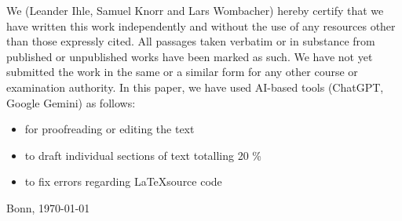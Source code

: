 
\thispagestyle{empty}

We (Leander Ihle, Samuel Knorr and Lars Wombacher) hereby certify that we have written this work independently and without the use of any resources other than those expressly cited. All passages taken verbatim or in substance from published or unpublished works have been marked as such. We have not yet submitted the work in the same or a similar form for any other course or examination authority. In this paper, we have used AI-based tools (ChatGPT, Google Gemini) as follows: 
\begin{itemize}
\item for proofreading or editing the text
\item to draft individual sections of text totalling 20 \%
\item to fix errors regarding \LaTeX source code
\end{itemize}

%
%
\vspace*{4mm}
\noindent
Bonn, \today
\par \vspace*{10mm}
% 
